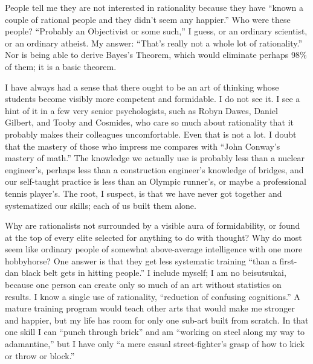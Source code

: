 
People tell me they are not interested in rationality because they have ``known a couple of rational people and they didn't seem any happier.'' Who were these people? ``Probably an Objectivist or some such,'' I guess, or an ordinary scientist, or an ordinary atheist. My answer: ``That's really not a whole lot of rationality.'' Nor is being able to derive Bayes's Theorem, which would eliminate perhaps 98\% of them; it is a basic theorem.

I have always had a sense that there ought to be an art of thinking whose students become visibly more competent and formidable. I do not see it. I see a hint of it in a few very senior psychologists, such as Robyn Dawes, Daniel Gilbert, and Tooby and Cosmides, who care so much about rationality that it probably makes their colleagues uncomfortable. Even that is not a lot. I doubt that the mastery of those who impress me compares with ``John Conway's mastery of math.'' The knowledge we actually use is probably less than a nuclear engineer's, perhaps less than a construction engineer's knowledge of bridges, and our self-taught practice is less than an Olympic runner's, or maybe a professional tennis player's. The root, I suspect, is that we have never got together and systematized our skills; each of us built them alone. 

Why are rationalists not surrounded by a visible aura of formidability, or found at the top of every elite selected for anything to do with thought? Why do most seem like ordinary people of somewhat above-average intelligence with one more hobbyhorse? One answer is that they get less systematic training ``than a first-dan black belt gets in hitting people.'' I include myself; I am no beisutsukai, because one person can create only so much of an art without statistics on results. I know a single use of rationality, ``reduction of confusing cognitions.'' A mature training program would teach other arts that would make me stronger and happier, but my life has room for only one sub-art built from scratch. In that one skill I can ``punch through brick'' and am ``working on steel along my way to adamantine,'' but I have only ``a mere casual street-fighter's grasp of how to kick or throw or block.''

